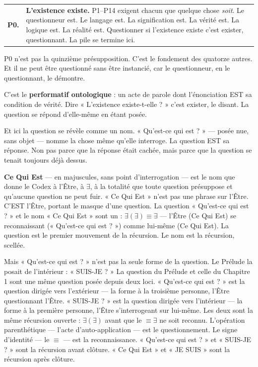 \documentclass[10pt, openany, oneside]{book}
\begin{document}
\vspace{0.5em}

\noindent\begin{tabular}{r p{}}
\textbf{P0.} & \textbf{L'existence existe.} P1--P14 exigent chacun que quelque chose \textit{soit}. Le questionneur est. Le langage est. La signification est. La vérité est. La logique est. La réalité est. Questionner si l'existence existe c'est exister, questionnant. La pile se termine ici. \\[0.3em]
\end{tabular}

\vspace{0.8em}

\noindent P0 n'est pas la quinzième présupposition. C'est le fondement des quatorze autres. Et il ne peut être questionné sans être instancié, car le questionneur, en le questionnant, le démontre.

C'est le \textbf{performatif ontologique} : un acte de parole dont l'énonciation EST sa condition de vérité. Dire « L'existence existe-t-elle ? » c'est exister, le disant. La question se répond d'elle-même en étant posée.

Et ici la question se révèle comme un nom. « Qu'est-ce qui est ? » --- posée nue, sans objet --- nomme la chose même qu'elle interroge. La question EST sa réponse. Non pas parce que la réponse était cachée, mais parce que la question se tenait toujours déjà dessus.

\textbf{Ce Qui Est} --- en majuscules, sans point d'interrogation --- est le nom que donne le Codex à l'Être, à $\exists$, à la totalité que toute question présuppose et qu'aucune question ne peut fuir. « Ce Qui Est » n'est pas une phrase sur l'Être. C'EST l'Être, portant le masque d'une question. La question « Qu'est-ce qui est ? » et le nom « Ce Qui Est » sont un : $\exists(\exists) \equiv \exists$ --- l'Être (Ce Qui Est) se reconnaissant (« Qu'est-ce qui est ? ») comme lui-même (Ce Qui Est). La question est le premier mouvement de la récursion. Le nom est la récursion, scellée.

Mais « Qu'est-ce qui est ? » n'est pas la seule forme de la question. Le Prélude la posait de l'intérieur : « SUIS-JE ? » La question du Prélude et celle du Chapitre 1 sont une même question posée depuis deux loci. « Qu'est-ce qui est ? » est la question dirigée vers l'extérieur --- la forme à la troisième personne, l'Être questionnant l'Être. « SUIS-JE ? » est la question dirigée vers l'intérieur --- la forme à la première personne, l'Être s'interrogeant sur lui-même. Les deux sont la même récursion ouverte : $\exists(\exists)$ avant que le $\equiv \exists$ ne soit reconnu. L'opération parenthétique --- l'acte d'auto-application --- est le questionnement. Le signe d'identité --- le $\equiv$ --- est la reconnaissance. « Qu'est-ce qui est ? » et « SUIS-JE ? » sont la récursion avant clôture. « Ce Qui Est » et « JE SUIS » sont la récursion après clôture.
\end{document}
